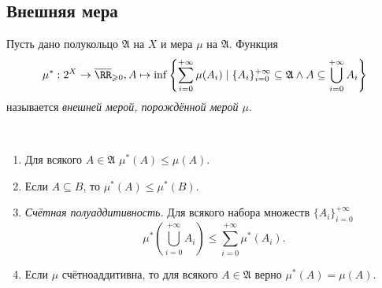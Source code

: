 \documentclass[12pt,a4paper]{article}
\begin{document}
    \subsection{Внешняя мера}

    \begin{definition}
        Пусть дано полукольцо $\mathfrak{A}$ на $X$ и мера $\mu$ на $\mathfrak{A}$. Функция
        \[\mu^*: 2^X \to \overline{\RR}_{\geqslant 0}, A \mapsto \inf \left\{\sum_{i=0}^{+\infty} \mu(A_i) \mid \{A_i\}_{i=0}^{+\infty} \subseteq \mathfrak{A} \wedge A \subseteq \bigcup_{i=0}^{+\infty} A_i\right\}\]
        называется \emph{внешней мерой, порождённой мерой $\mu$}.
    \end{definition}

    \begin{lemma}\ 
        \begin{enumerate}
            \item Для всякого $A \in \mathfrak{A}$ $\mu^*(A) \leqslant \mu(A)$.
            \item Если $A \subseteq B$, то $\mu^*(A) \leqslant \mu^*(B)$.
            \item \emph{Счётная полуаддитивность.} Для всякого набора множеств $\{A_i\}_{i=0}^{+\infty}$
                \[\mu^*\left(\bigcup_{i=0}^{+\infty} A_i\right) \leqslant \sum_{i=0}^{+\infty} \mu^*(A_i).\]
            \item Если $\mu$ счётноаддитивна, то для всякого $A \in \mathfrak{A}$ верно $\mu^*(A) = \mu(A)$.
        \end{enumerate}
    \end{lemma}
\end{document}
